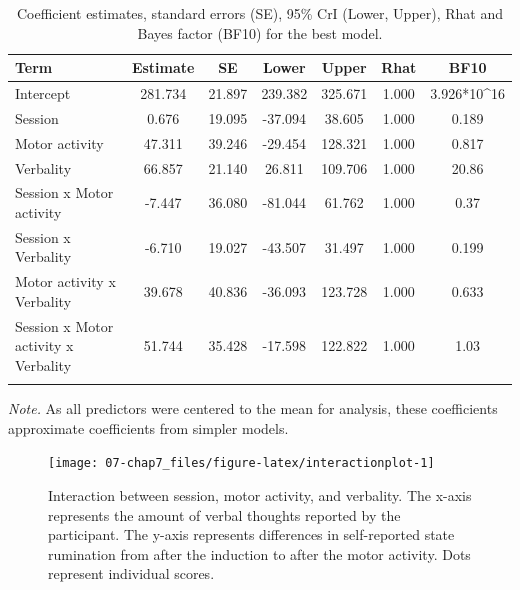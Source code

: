 \documentclass[a4paper,12pt,twoside,openright,oldfontcommands]{memoir}
\begin{document}
\begin{table}[H]
\begin{center}
\begin{threeparttable}
\caption{\label{tab:paramexp2}Coefficient estimates, standard errors (SE), 95\% CrI (Lower, Upper), Rhat and Bayes factor (BF10) for the best model.}
\small{
\begin{tabular}{lcccccc}
\toprule
Term & \multicolumn{1}{c}{Estimate} & \multicolumn{1}{c}{SE} & \multicolumn{1}{c}{Lower} & \multicolumn{1}{c}{Upper} & \multicolumn{1}{c}{Rhat} & \multicolumn{1}{c}{BF10}\\
\midrule
Intercept & 281.734 & 21.897 & 239.382 & 325.671 & 1.000 & 3.926*10\textasciicircum{}16\\
Session & 0.676 & 19.095 & -37.094 & 38.605 & 1.000 & 0.189\\
Motor activity & 47.311 & 39.246 & -29.454 & 128.321 & 1.000 & 0.817\\
Verbality & 66.857 & 21.140 & 26.811 & 109.706 & 1.000 & 20.86\\
Session x Motor activity & -7.447 & 36.080 & -81.044 & 61.762 & 1.000 & 0.37\\
Session x Verbality & -6.710 & 19.027 & -43.507 & 31.497 & 1.000 & 0.199\\
Motor activity x Verbality & 39.678 & 40.836 & -36.093 & 123.728 & 1.000 & 0.633\\
Session x Motor activity x Verbality & 51.744 & 35.428 & -17.598 & 122.822 & 1.000 & 1.03\\
\bottomrule
\addlinespace
\end{tabular}
}
\begin{tablenotes}[para]
\textit{Note.} As all predictors were centered to the mean for analysis, these coefficients approximate coefficients from simpler models.
\end{tablenotes}
\end{threeparttable}
\end{center}
\end{table}

\begin{figure}

{\centering \texttt{[image: 07-chap7\_files/figure-latex/interactionplot-1]} 

}

\caption{Interaction between session, motor activity, and verbality. The x-axis represents the amount of verbal thoughts reported by the participant. The y-axis represents differences in self-reported state rumination from after the induction to after the motor activity. Dots represent individual scores.}\label{fig:interactionplot}
\end{figure}
\end{document}
